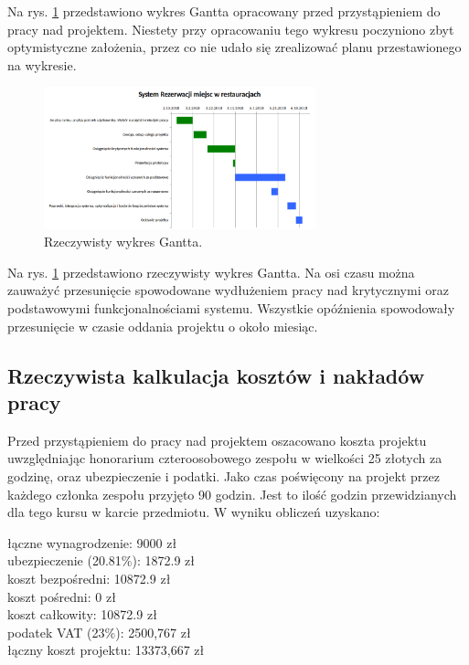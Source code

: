 \documentclass{article}
\newcommand\tab[1][1cm]{\hspace*{#1}}
\begin{document}
Na rys. \ref{fig:gantt} przedstawiono wykres Gantta opracowany przed przystąpieniem do pracy nad projektem. Niestety przy opracowaniu tego wykresu poczyniono zbyt optymistyczne założenia, przez co nie udało się zrealizować planu przestawionego na wykresie.

\begin{figure}[h]
\centering
	\includegraphics[width=0.70\textwidth]{gantt_real.png}
	\caption[caption]{Rzeczywisty wykres Gantta.}
	\label{fig:gantt}
\end{figure}

Na rys. \ref{fig:gantt} przedstawiono rzeczywisty wykres Gantta. Na osi czasu można zauważyć przesunięcie spowodowane wydłużeniem pracy nad krytycznymi oraz podstawowymi funkcjonalnościami systemu. Wszystkie opóźnienia spowodowały przesunięcie w czasie oddania projektu o około miesiąc.


\subsection{Rzeczywista kalkulacja kosztów i nakładów pracy}

Przed przystąpieniem do pracy nad projektem oszacowano koszta projektu uwzględniając honorarium czteroosobowego zespołu w wielkości 25 złotych za godzinę, oraz ubezpieczenie i podatki. Jako czas poświęcony na projekt przez każdego członka zespołu przyjęto 90 godzin. Jest to ilość godzin przewidzianych dla tego kursu w karcie przedmiotu. W wyniku obliczeń uzyskano:

\hspace*{0.35cm} łączne wynagrodzenie: 9000 zł \\
\tab ubezpieczenie (20.81\%): 1872.9 zł \\
\tab koszt bezpośredni: 10872.9 zł \\
\tab koszt pośredni: 0 zł \\
\tab koszt całkowity: 10872.9 zł \\
\tab podatek VAT (23\%): 2500,767 zł \\
\tab łączny koszt projektu: 13373,667 zł
\end{document}
